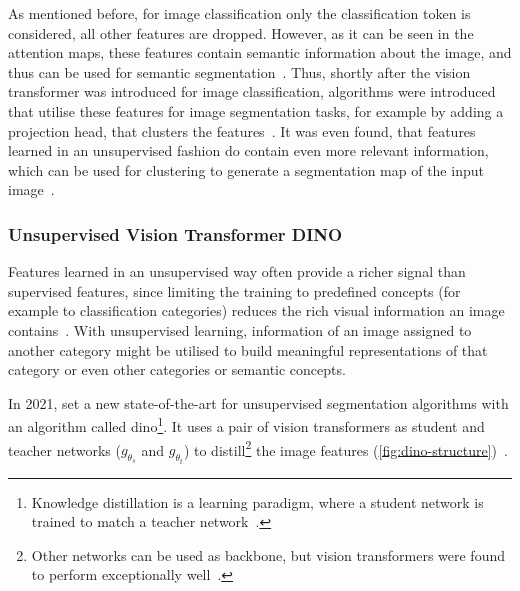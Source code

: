 As mentioned before, for image classification only the classification token is considered, all other features are dropped.
However, as it can be seen in the attention maps, these features contain semantic information about the image, and thus can be used for semantic segmentation~\autocite{Dosovitskiy2021}.
Thus, shortly after the vision transformer was introduced for image classification, algorithms were introduced that utilise these features for image segmentation tasks, for example by adding a projection head, that clusters the features~\autocite{Caron2021}.
It was even found, that features learned in an unsupervised fashion do contain even more relevant information, which can be used for clustering to generate a segmentation map of the input image~\autocite{Caron2021}.

 \subsubsection{Unsupervised Vision Transformer DINO}
Features learned in an unsupervised way often provide a richer signal than supervised features, since limiting the training to predefined concepts (for example to classification categories) reduces the rich visual information an image contains~\autocite{Caron2021}.
With unsupervised learning, information of an image assigned to another category might be utilised to build meaningful representations of that category or even other categories or semantic concepts.

In 2021, \citeauthor{Caron2021} set a new state-of-the-art for unsupervised segmentation algorithms with an algorithm called \gls{dino}\footnote{Knowledge distillation is a learning paradigm, where a student network is trained to match a teacher network~\autocite{Caron2021}.}.
It uses a pair of vision transformers as student and teacher networks ($g_{\theta_s}$ and $g_{\theta_t}$) to distill\footnote{Other networks can be used as backbone, but vision transformers were found to perform exceptionally well~\autocite{Caron2021}.} the image features (\autoref{fig:dino-structure})~\autocite{Caron2021}.

